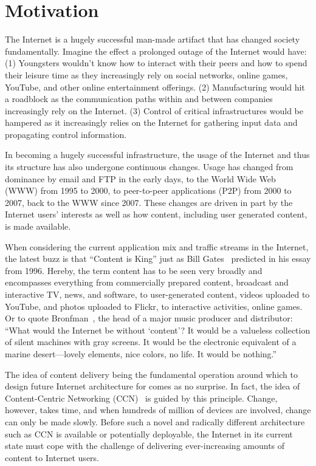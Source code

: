 \section{Motivation}

The Internet is a hugely successful man-made artifact that has changed society
fundamentally.  Imagine the effect a prolonged outage of the Internet would
have: (1) Youngsters wouldn't know how to interact with their peers and how to
spend their leisure time as they increasingly rely on social networks, online
games, YouTube, and other online entertainment offerings.  (2) Manufacturing
would hit a roadblock as the communication paths within and between companies
increasingly rely on the Internet. (3) Control of critical infrastructures
would be hampered as it increasingly relies on the Internet for gathering input
data and propagating control information.

In becoming a hugely successful infrastructure, the usage of the Internet and
thus its structure has also undergone continuous changes. Usage has changed
from dominance by email and FTP in the early days, to the World Wide Web (WWW)
from 1995 to 2000, to peer-to-peer applications (P2P) from 2000 to 2007, back
to the WWW since 2007. These changes are driven in part by the Internet users'
interests as well as how content, including user generated content, is made
available.

When considering the current application mix and traffic streams in the
Internet, the latest buzz is that ``Content is King'' just as Bill
Gates~\cite{Gates-Content-King} predicted in his essay from 1996.  Hereby, the
term content has to be seen very broadly and encompasses everything from
commercially prepared content, \eg broadcast and interactive TV, news, and
software, to user-generated content, \eg videos uploaded to YouTube, and photos
uploaded to Flickr, to interactive activities, \eg online games. Or to quote
Bronfman~\cite{Bronfman-remarks}, the head of a major music producer and
distributor: ``What would the Internet be without `content'? It would be a
valueless collection of silent machines with gray screens. It would be the
electronic equivalent of a marine desert---lovely elements, nice colors, no
life.  It would be nothing.''

The idea of content delivery being the fundamental operation around which to
design future Internet architecture for comes as no surprise. In fact, the idea
of Content-Centric Networking (CCN)~\cite{CCN} is guided by this principle.
Change, however, takes time, and when hundreds of million of devices are
involved, change can only be made slowly. Before such a novel and radically
different architecture such as CCN is available or potentially deployable, the
Internet in its current state must cope with the challenge of delivering
ever-increasing amounts of content to Internet users.

